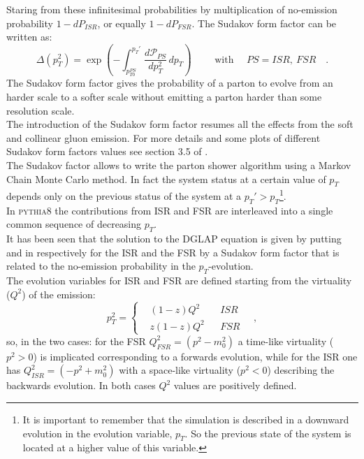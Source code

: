 Staring from these infinitesimal probabilities by multiplication of no-emission probability $1-dP_{ISR}$, or equally $1-dP_{FSR}$. 
The Sudakov form factor can be written as: %
\begin{equation}
	\Delta(p_T^2)=\exp\left( -\displaystyle\int_{p_{T0}^{PS}}^{p_T'} \frac{d\mathcal{P}_{PS}}{dp_T^2} \,dp_T\right) \qquad\text{ with } \quad PS=ISR,\ FSR \quad.
	\label{eq:sudakovFormFactor}
\end{equation}
The Sudakov form factor gives the probability of a parton to evolve from an harder scale to a softer scale without emitting a parton harder than some resolution scale.
\\
The introduction of the Sudakov form factor resumes all the effects from the soft and collinear gluon emission. For more details and some plots of different Sudakov form factors values see section 3.5 of \cite{Campbell2006}.
\\
The Sudakov factor allows to write the parton shower algorithm using a Markov Chain Monte Carlo method. In fact the system status at a certain value of $p_T$ depends only on the previous status of the system at a $p_T'>p_T$\footnote{It is important to remember that the simulation is described in a downward evolution in the evolution variable, $p_T$. So the previous state of the system is located at a higher value of this variable.}. 
\\
In \textsc{pythia}8 the contributions from ISR and FSR are interleaved into a single common sequence of decreasing $p_T$. 
\\
It has been seen that the solution to the DGLAP equation is given by putting  and  in  respectively for the ISR and the FSR by a Sudakov form factor that is related to the no-emission probability in the $p_T$-evolution. 
\\
The evolution variables for ISR and FSR are defined starting from the virtuality ($Q^2$) of the emission:
\begin{equation}
	p_T^2=\left\{\begin{aligned}
		&(1-z)Q^2 && ISR\\
		&z(1-z)Q^2 && FSR
	\end{aligned}\right.\quad,
	\label{eq:partonShowerEvolutionVariables}
\end{equation}
so, in the two cases: for the FSR $Q^2_{FSR}=(p^2-m_0^2)$ a time-like virtuality ($p^2>0$) is implicated corresponding to a forwards evolution, while for the ISR one has $Q^2_{ISR}=(-p^2+m_0^2)$ with a space-like virtuality ($p^2<0$) describing the backwards evolution. In both cases $Q^2$ values are positively defined. 

